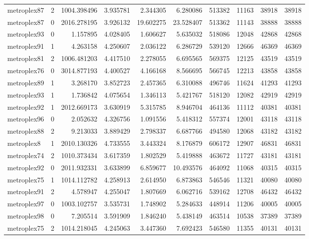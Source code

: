 \begin{longtable}{|l|r|r|r|r|r|r|r|r|r|}
metroplex87 & 2 & 1004.398496 & 3.935781 & 2.344305 & 6.280086 & 513382 & 11163 & 38918 & 38918 \\
metroplex87 & 0 & 2016.278195 & 3.926132 & 19.602275 & 23.528407 & 513362 & 11143 & 38888 & 38888 \\
metroplex93 & 0 & 1.157895 & 4.028405 & 1.606627 & 5.635032 & 518086 & 12048 & 42868 & 42868 \\
metroplex91 & 1 & 4.263158 & 4.250607 & 2.036122 & 6.286729 & 539120 & 12666 & 46369 & 46369 \\
metroplex81 & 2 & 1006.481203 & 4.417510 & 2.278055 & 6.695565 & 569375 & 12125 & 43519 & 43519 \\
metroplex76 & 0 & 3014.877193 & 4.400527 & 4.166168 & 8.566695 & 566745 & 12213 & 43858 & 43858 \\
metroplex89 & 1 & 3.268170 & 3.852723 & 2.457365 & 6.310088 & 496746 & 11624 & 41293 & 41293 \\
metroplex93 & 1 & 1.736842 & 4.075654 & 1.346113 & 5.421767 & 518120 & 12082 & 42919 & 42919 \\
metroplex92 & 1 & 2012.669173 & 3.630919 & 5.315785 & 8.946704 & 464136 & 11112 & 40381 & 40381 \\
metroplex96 & 0 & 2.052632 & 4.326756 & 1.091556 & 5.418312 & 557374 & 12001 & 43118 & 43118 \\
metroplex88 & 2 & 9.213033 & 3.889429 & 2.798337 & 6.687766 & 494580 & 12068 & 43182 & 43182 \\
metroplex8 & 1 & 2010.130326 & 4.733555 & 3.443324 & 8.176879 & 606172 & 12907 & 46831 & 46831 \\
metroplex74 & 2 & 1010.373434 & 3.617359 & 1.802529 & 5.419888 & 463672 & 11727 & 43181 & 43181 \\
metroplex92 & 0 & 2011.932331 & 3.633899 & 6.859677 & 10.493576 & 464092 & 11068 & 40315 & 40315 \\
metroplex75 & 1 & 1014.112782 & 4.258913 & 2.614950 & 6.873863 & 546546 & 11321 & 40080 & 40080 \\
metroplex91 & 2 & 4.578947 & 4.255047 & 1.807669 & 6.062716 & 539162 & 12708 & 46432 & 46432 \\
metroplex97 & 0 & 1003.102757 & 3.535731 & 1.748902 & 5.284633 & 448914 & 11206 & 40005 & 40005 \\
metroplex98 & 0 & 7.205514 & 3.591909 & 1.846240 & 5.438149 & 463514 & 10538 & 37389 & 37389 \\
metroplex75 & 2 & 1014.218045 & 4.245063 & 3.447360 & 7.692423 & 546580 & 11355 & 40131 & 40131 \\

\end{longtable}
